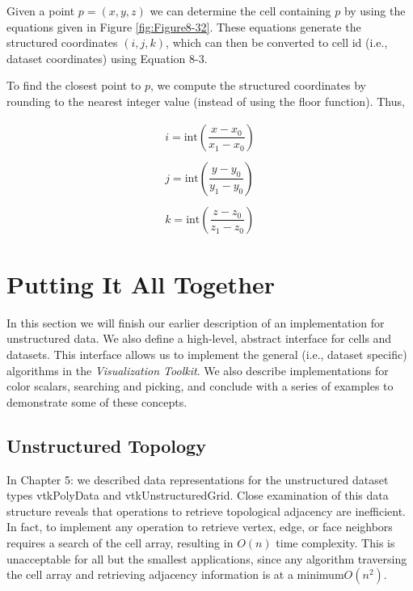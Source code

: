 Given a point $p = (x, y, z)$ we can determine the cell containing $p$ by using the equations given in Figure \ref{fig:Figure8-32}. These equations generate the structured coordinates $(i, j, k)$, which can then be converted to cell id (i.e., dataset coordinates) using Equation 8-3.

To find the closest point to $p$, we compute the structured coordinates by rounding to the nearest integer value (instead of using the floor function). Thus,

\begin{equation}\label{eq:8.31}
\begin{array}{lll}
i = \text{int}\left( \dfrac{x-x_0}{x_1 - x_0} \right) \\ \\
j = \text{int}\left( \dfrac{y-y_0}{y_1 - y_0} \right) \\ \\
k = \text{int}\left( \dfrac{z-z_0}{z_1 - z_0} \right)
\end{array}
\end{equation}

\section{Putting It All Together}

In this section we will finish our earlier description of an implementation for unstructured data. We also define a high-level, abstract interface for cells and datasets. This interface allows us to implement the general (i.e., dataset specific) algorithms in the \emph{Visualization Toolkit}. We also describe
implementations for color scalars, searching and picking, and conclude with a series of examples to demonstrate some of these concepts.

\subsection{Unstructured Topology}

In Chapter 5:  we described data representations for the unstructured dataset types vtkPolyData and vtkUnstructuredGrid. Close examination of this data structure reveals that operations to retrieve topological adjacency are inefficient. In fact, to implement any operation to retrieve vertex, edge, or face neighbors requires a search of the cell array, resulting in $O(n)$ time complexity. This is unacceptable for all but the smallest applications, since any algorithm traversing the cell array and retrieving adjacency information is at a minimum$ O(n^2)$.

